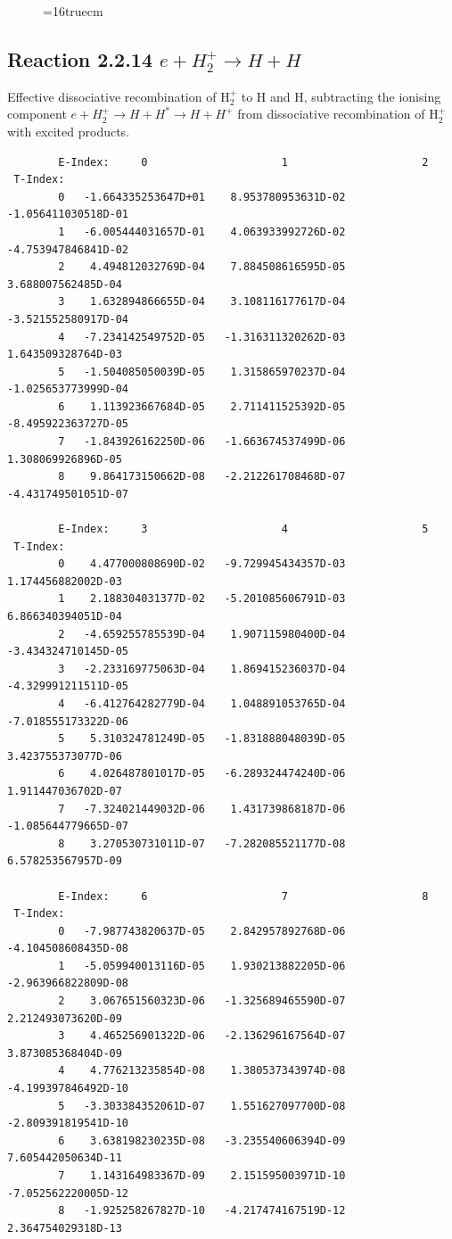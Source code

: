 \documentclass[12pt,dvips]{article}
\begin{document}
\begin{figure} \label{2.2.12}
\epsfxsize=16truecm
\end{figure}
\newpage



\subsection{
Reaction 2.2.14  $ e + H_2^+    \rightarrow H + H  $
}
Effective dissociative recombination of H$_2^+$ to H and H, subtracting the
ionising component $e+H_2^+ \rightarrow H + H^* \rightarrow H + H^+$ from dissociative recombination of H$_2^+$ with excited products.


\begin{small}\begin{verbatim}
        E-Index:     0                     1                     2
 T-Index:
        0   -1.664335253647D+01    8.953780953631D-02   -1.056411030518D-01
        1   -6.005444031657D-01    4.063933992726D-02   -4.753947846841D-02
        2    4.494812032769D-04    7.884508616595D-05    3.688007562485D-04
        3    1.632894866655D-04    3.108116177617D-04   -3.521552580917D-04
        4   -7.234142549752D-05   -1.316311320262D-03    1.643509328764D-03
        5   -1.504085050039D-05    1.315865970237D-04   -1.025653773999D-04
        6    1.113923667684D-05    2.711411525392D-05   -8.495922363727D-05
        7   -1.843926162250D-06   -1.663674537499D-06    1.308069926896D-05
        8    9.864173150662D-08   -2.212261708468D-07   -4.431749501051D-07

        E-Index:     3                     4                     5
 T-Index:
        0    4.477000808690D-02   -9.729945434357D-03    1.174456882002D-03
        1    2.188304031377D-02   -5.201085606791D-03    6.866340394051D-04
        2   -4.659255785539D-04    1.907115980400D-04   -3.434324710145D-05
        3   -2.233169775063D-04    1.869415236037D-04   -4.329991211511D-05
        4   -6.412764282779D-04    1.048891053765D-04   -7.018555173322D-06
        5    5.310324781249D-05   -1.831888048039D-05    3.423755373077D-06
        6    4.026487801017D-05   -6.289324474240D-06    1.911447036702D-07
        7   -7.324021449032D-06    1.431739868187D-06   -1.085644779665D-07
        8    3.270530731011D-07   -7.282085521177D-08    6.578253567957D-09

        E-Index:     6                     7                     8
 T-Index:
        0   -7.987743820637D-05    2.842957892768D-06   -4.104508608435D-08
        1   -5.059940013116D-05    1.930213882205D-06   -2.963966822809D-08
        2    3.067651560323D-06   -1.325689465590D-07    2.212493073620D-09
        3    4.465256901322D-06   -2.136296167564D-07    3.873085368404D-09
        4    4.776213235854D-08    1.380537343974D-08   -4.199397846492D-10
        5   -3.303384352061D-07    1.551627097700D-08   -2.809391819541D-10
        6    3.638198230235D-08   -3.235540606394D-09    7.605442050634D-11
        7    1.143164983367D-09    2.151595003971D-10   -7.052562220005D-12
        8   -1.925258267827D-10   -4.217474167519D-12    2.364754029318D-13


\end{verbatim}
\end{small}
\end{document}
